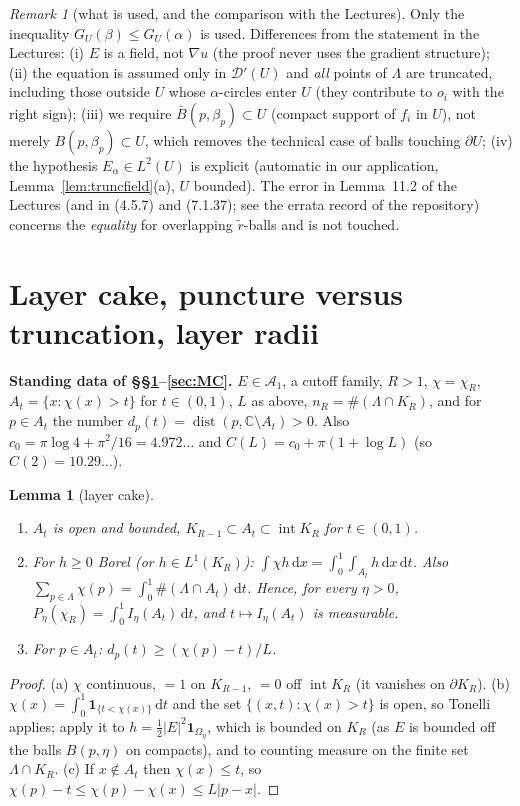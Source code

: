 \documentclass[11pt]{article}
\newtheorem{lemma}[theorem]{Lemma}
\theoremstyle{definition}
\theoremstyle{remark}
\newtheorem{remark}[theorem]{Remark}
\newcommand{\C}{\mathbb C}
\newcommand{\dd}{\,\mathrm d}
\newcommand{\Lam}{\Lambda}
\DeclareMathOperator{\dist}{dist}
\begin{document}
\begin{remark}[what is used, and the comparison with the Lectures]\label{rem:413}
Only the inequality $G_U(\beta)\le G_U(\alpha)$ is used.  Differences from the statement in the Lectures:
(i) $E$ is a field, not $\nabla u$ (the proof never uses the gradient structure);
(ii) the equation is assumed only in $\mathcal D'(U)$ and \emph{all} points of $\Lam$ are truncated, including those outside $U$ whose
$\alpha$-circles enter $U$ (they contribute to $o_i$ with the right sign); (iii) we require $\bar B(p,\beta_p)\subset U$ (compact support of $f_i$ in $U$),
not merely $B(p,\beta_p)\subset U$, which removes the technical case of balls touching $\partial U$;
(iv) the hypothesis $E_\alpha\in L^2(U)$ is explicit (automatic in our application, Lemma~\ref{lem:truncfield}(a), $U$ bounded).
The error in Lemma~11.2 of the Lectures (and in (4.5.7) and (7.1.37); see the errata record of the repository)
concerns the \emph{equality} for overlapping $\tilde r$-balls and is not touched.
\end{remark}

\section{Layer cake, puncture versus truncation, layer radii}\label{sec:layers}

\textbf{Standing data of \S\S\ref{sec:layers}--\ref{sec:MC}.}  $E\in\mathcal A_1$, a cutoff family, $R>1$, $\chi=\chi_R$,
$A_t=\{x:\chi(x)>t\}$ for $t\in(0,1)$, $L$ as above, $n_R=\#(\Lam\cap K_R)$, and for $p\in A_t$ the number $d_p(t)=\dist(p,\C\setminus A_t)>0$.
Also $c_0=\pi\log4+\pi^2/16=4.972\ldots$ and $C(L)=c_0+\pi(1+\log L)$ (so $C(2)=10.29\ldots$).

\begin{lemma}[layer cake]\label{lem:layer}
\begin{enumerate}[label=(\alph*)]
\item $A_t$ is open and bounded, $K_{R-1}\subset A_t\subset\operatorname{int}K_R$ for $t\in(0,1)$.
\item For $h\ge0$ Borel (or $h\in L^1(K_R)$): $\int\chi h\dd x=\int_0^1\int_{A_t}h\dd x\dd t$.  Also $\sum_{p\in\Lam}\chi(p)=\int_0^1\#(\Lam\cap A_t)\dd t$.
Hence, for every $\eta>0$, $P_\eta(\chi_R)=\int_0^1I_\eta(A_t)\dd t$, and $t\mapsto I_\eta(A_t)$ is measurable.
\item For $p\in A_t$: $d_p(t)\ge(\chi(p)-t)/L$.
\end{enumerate}
\end{lemma}
\begin{proof}
(a) $\chi$ continuous, $=1$ on $K_{R-1}$, $=0$ off $\operatorname{int}K_R$ (it vanishes on $\partial K_R$).  (b) $\chi(x)=\int_0^1\mathbf 1_{\{t<\chi(x)\}}\dd t$ and the set
$\{(x,t):\chi(x)>t\}$ is open, so Tonelli applies; apply it to $h=\frac12|E|^2\mathbf 1_{\Omega_\eta}$, which is bounded on $K_R$ (as $E$ is bounded off the balls $B(p,\eta)$ on compacts),
and to counting measure on the finite set $\Lam\cap K_R$.  (c) If $x\notin A_t$ then $\chi(x)\le t$, so $\chi(p)-t\le\chi(p)-\chi(x)\le L|p-x|$.
\end{proof}
\end{document}
